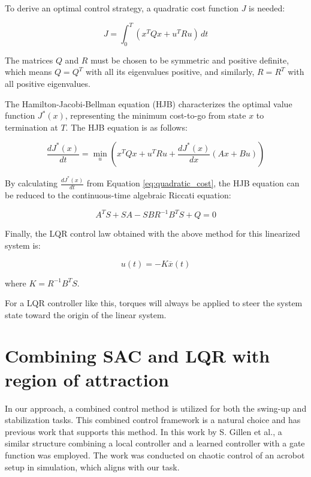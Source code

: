 To derive an optimal control strategy, a quadratic cost function \(J\) is needed:

\begin{equation}
  J = \int_0^{T} \left( x^T Q x + u^T R u \right) \, dt
  \label{eq:quadratic_cost}
\end{equation}

The matrices \(Q\) and \(R\) must be chosen to be symmetric and positive definite, which means \(Q = Q^T\) with all its eigenvalues positive, and similarly, \(R = R^T\) with all positive eigenvalues.

The Hamilton-Jacobi-Bellman equation (HJB) characterizes the optimal value function \(J^*(x)\), representing the minimum cost-to-go from state \(x\) to termination at \(T\). The HJB equation is as follows:

\begin{equation}
 \frac{dJ^*(x)}{dt} = \min_u \left( x^T Q x + u^T R u + \frac{dJ^*(x)}{dx} (Ax + Bu) \right)
 \label{eq:HJB}
\end{equation}

By calculating \(\frac{dJ^*(x)}{dt}\) from Equation \ref{eq:quadratic_cost}, the HJB equation can be reduced to the continuous-time algebraic Riccati equation:

\begin{equation}
 A^T S + SA - SBR^{-1}B^T S + Q = 0
\end{equation}

Finally, the LQR control law obtained with the above method for this linearized system is:

\begin{equation}
 u(t) = -K\overline{x}(t)
\end{equation}

where \(K = R^{-1}B^T S\).

For a LQR controller like this, torques will always be applied to steer the system state toward the origin of the linear system.


\section{Combining SAC and LQR with region of attraction}
In our approach, a combined control method is utilized for both the swing-up and stabilization tasks. This combined control framework is a natural choice and has previous work that supports this method. In this work by S. Gillen et al.\cite{gillen2020combining}, a similar structure combining a local controller and a learned controller with a gate function was employed. The work was conducted on chaotic control of an acrobot setup in simulation, which aligns with our task.

